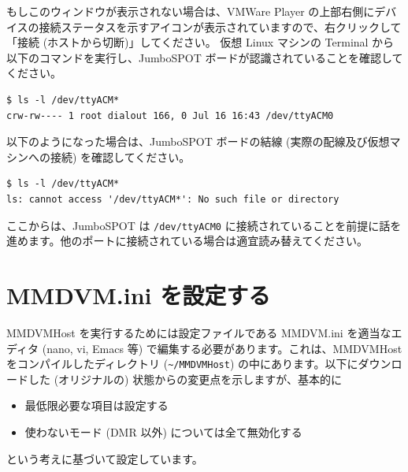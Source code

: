 \documentclass[a4j,oneside]{ujbook}
\begin{document}
もしこのウィンドウが表示されない場合は、VMWare Player の上部右側にデバイスの接続ステータスを示すアイコンが表示されていますので、右クリックして「接続 (ホストから切断)」してください。
仮想 Linux マシンの Terminal から以下のコマンドを実行し、JumboSPOT ボードが認識されていることを確認してください。

\begin{verbatim}
$ ls -l /dev/ttyACM*
crw-rw---- 1 root dialout 166, 0 Jul 16 16:43 /dev/ttyACM0
\end{verbatim}

以下のようになった場合は、JumboSPOT ボードの結線 (実際の配線及び仮想マシンへの接続) を確認してください。

\begin{verbatim}
$ ls -l /dev/ttyACM*
ls: cannot access '/dev/ttyACM*': No such file or directory
\end{verbatim}

ここからは、JumboSPOT は \verb+/dev/ttyACM0+ に接続されていることを前提に話を進めます。他のポートに接続されている場合は適宜読み替えてください。

\section{MMDVM.ini を設定する}

MMDVMHost を実行するためには設定ファイルである MMDVM.ini を適当なエディタ (nano, vi, Emacs 等) で編集する必要があります。これは、MMDVMHost をコンパイルしたディレクトリ (\verb+~/MMDVMHost+) の中にあります。以下にダウンロードした (オリジナルの) 状態からの変更点を示しますが、基本的に
\begin{itemize}
 \item 最低限必要な項目は設定する
 \item 使わないモード (DMR 以外) については全て無効化する
\end{itemize}
という考えに基づいて設定しています。
\end{document}
